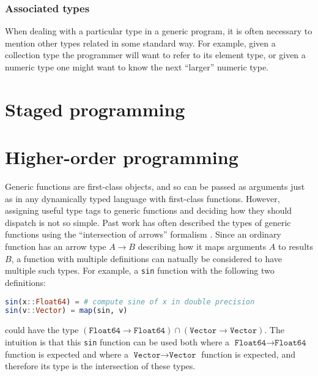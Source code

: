 \subsubsection{Associated types}

When dealing with a particular type in a generic program, it is often
necessary to mention other types related in some standard way.
For example, given a collection type the programmer will want to
refer to its element type, or given a numeric type one might want to
know the next ``larger'' numeric type.


\section{Staged programming}
\label{sec:stagedprogramming}

\section{Higher-order programming}

Generic functions are first-class objects, and so can be passed as arguments
just as in any dynamically typed language with first-class functions.
However, assigning useful type tags to generic functions and deciding how
they should dispatch is not so simple. Past work has often described the
types of generic functions using the ``intersection of arrows'' formalism
\cite{RonchiDellaRocca:1988:PTS:55079.55086} \cite{Dunfield:2012:EIU:2364527.2364534}
\cite{boundedquant} \cite{Castagna:1995:COF:203496.203510}. Since an ordinary
function has an arrow type $A\rightarrow B$ describing how it maps arguments
$A$ to results $B$, a function with multiple definitions can natually be
considered to have multiple such types. For example, a \texttt{sin} function
with the following two definitions:

\begin{singlespace}
\begin{lstlisting}[language=julia]
sin(x::Float64) = # compute sine of x in double precision
sin(v::Vector) = map(sin, v)
\end{lstlisting}
\end{singlespace}

\noindent
could have the type $(\texttt{Float64}\rightarrow\texttt{Float64})\cap(\texttt{Vector}\rightarrow\texttt{Vector})$. The intuition is that this \texttt{sin} function can be
used both where a $\texttt{Float64}\rightarrow\texttt{Float64}$ function
is expected and where a $\texttt{Vector}\rightarrow\texttt{Vector}$ function is expected,
and therefore its type is the intersection of these types.

